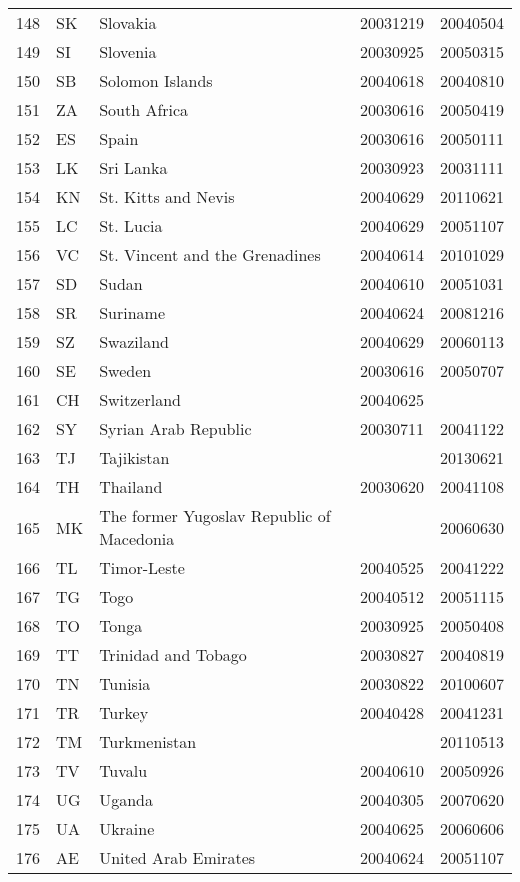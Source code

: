 \begin{longtable}{rllrr}
  148 & SK & Slovakia & 20031219 & 20040504 \\ 
  149 & SI & Slovenia & 20030925 & 20050315 \\ 
  150 & SB & Solomon Islands & 20040618 & 20040810 \\ 
  151 & ZA & South Africa & 20030616 & 20050419 \\ 
  152 & ES & Spain & 20030616 & 20050111 \\ 
  153 & LK & Sri Lanka & 20030923 & 20031111 \\ 
  154 & KN & St. Kitts and Nevis & 20040629 & 20110621 \\ 
  155 & LC & St. Lucia & 20040629 & 20051107 \\ 
  156 & VC & St. Vincent and the Grenadines & 20040614 & 20101029 \\ 
  157 & SD & Sudan & 20040610 & 20051031 \\ 
  158 & SR & Suriname & 20040624 & 20081216 \\ 
  159 & SZ & Swaziland & 20040629 & 20060113 \\ 
  160 & SE & Sweden & 20030616 & 20050707 \\ 
  161 & CH & Switzerland & 20040625 &  \\ 
  162 & SY & Syrian Arab Republic & 20030711 & 20041122 \\ 
  163 & TJ & Tajikistan &  & 20130621 \\ 
  164 & TH & Thailand & 20030620 & 20041108 \\ 
  165 & MK & The former Yugoslav Republic of Macedonia &  & 20060630 \\ 
  166 & TL & Timor-Leste & 20040525 & 20041222 \\ 
  167 & TG & Togo & 20040512 & 20051115 \\ 
  168 & TO & Tonga & 20030925 & 20050408 \\ 
  169 & TT & Trinidad and Tobago & 20030827 & 20040819 \\ 
  170 & TN & Tunisia & 20030822 & 20100607 \\ 
  171 & TR & Turkey & 20040428 & 20041231 \\ 
  172 & TM & Turkmenistan &  & 20110513 \\ 
  173 & TV & Tuvalu & 20040610 & 20050926 \\ 
  174 & UG & Uganda & 20040305 & 20070620 \\ 
  175 & UA & Ukraine & 20040625 & 20060606 \\ 
  176 & AE & United Arab Emirates & 20040624 & 20051107 \\ 

\end{longtable}
